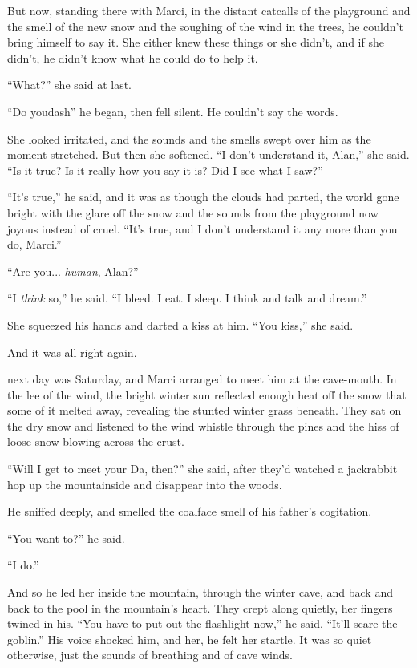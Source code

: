 But now, standing there with Marci, in the distant catcalls of the
playground and the smell of the new snow and the soughing of the wind
in the trees, he couldn't bring himself to say it.  She either knew
these things or she didn't, and if she didn't, he didn't know what he
could do to help it.

``What?'' she said at last.

``Do youdash{}'' he began, then fell silent.  He couldn't say the words.

She looked irritated, and the sounds and the smells swept over him as
the moment stretched.  But then she softened.  ``I don't understand
it, Alan,'' she said.  ``Is it true?  Is it really how you say it is? 
Did I see what I saw?''

``It's true,'' he said, and it was as though the clouds had parted,
the world gone bright with the glare off the snow and the sounds from
the playground now joyous instead of cruel.  ``It's true, and I don't
understand it any more than you do, Marci.''

``Are you...  \textit{human}, Alan?''

``I \textit{think} so,'' he said.  ``I bleed.  I eat.  I sleep.  I
think and talk and dream.''

She squeezed his hands and darted a kiss at him.  ``You kiss,'' she
said.

And it was all right again.

 next day was Saturday, and Marci arranged to meet him at the
cave-mouth.  In the lee of the wind, the bright winter sun reflected
enough heat off the snow that some of it melted away, revealing the
stunted winter grass beneath.  They sat on the dry snow and listened
to the wind whistle through the pines and the hiss of loose snow
blowing across the crust.

``Will I get to meet your Da, then?'' she said, after they'd watched a
jackrabbit hop up the mountainside and disappear into the woods.

He sniffed deeply, and smelled the coalface smell of his father's
cogitation.

``You want to?'' he said.

``I do.''

And so he led her inside the mountain, through the winter cave, and
back and back to the pool in the mountain's heart.  They crept along
quietly, her fingers twined in his.  ``You have to put out the
flashlight now,'' he said.  ``It'll scare the goblin.'' His voice
shocked him, and her, he felt her startle.  It was so quiet otherwise,
just the sounds of breathing and of cave winds.

